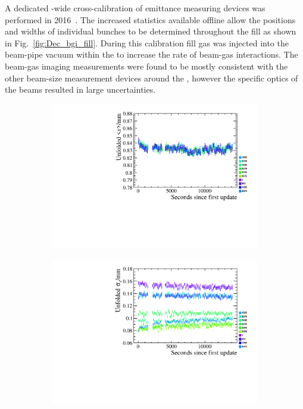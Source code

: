 A dedicated \lhc-wide cross-calibration of emittance measuring devices was performed in 2016~\cite{Hadavizadeh:IPAC2017-MOPAB131}. The increased statistics available offline allow the positions and widths of individual bunches to be determined throughout the fill as shown in Fig.~\ref{fig:Dec_bgi_fill}. During this calibration fill gas was injected into the beam-pipe vacuum within the \velo to increase the rate of beam-gas interactions. The \lhcb beam-gas imaging measurements were found to be mostly consistent with the other beam-size measurement devices around the \lhc, however the specific optics of the \lhc beams resulted in large uncertainties.   
\begin{figure}[!h]
    \centering
    \begin{subfigure}[m]{0.49\textwidth}
        \centering
        \includegraphics[width=1.0\textwidth]{figs/Detector/PerBXID_MeanX_unfolded_Beam1.pdf}
    \end{subfigure}
    \begin{subfigure}[m]{0.49\textwidth}
        \centering
        \includegraphics[width=1.0\textwidth]{figs/Detector/PerBXID_SigmaX_unfolded_Beam1.pdf}

\end{subfigure}
\end{figure}
